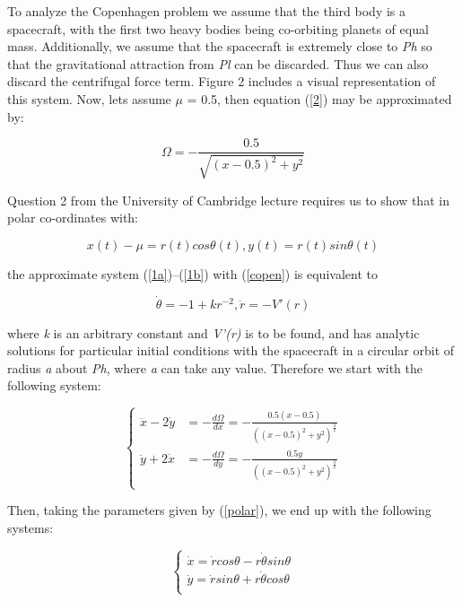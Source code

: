 \documentclass{article}
\begin{document}
To analyze the Copenhagen problem we assume that the third body is a spacecraft, with the first two heavy bodies being co-orbiting planets of equal mass. Additionally, we assume that the spacecraft is extremely close to \textit{Ph} so that the gravitational attraction from \textit{Pl} can be discarded. Thus we can also discard the centrifugal force term. Figure 2 includes a visual representation of this system. Now, lets assume $\mu$ = 0.5, then equation (\ref{2}) may be approximated by:

\begin{equation}\label{copen}
\Omega = - \frac{0.5}{ \sqrt{ (x - 0.5)^2+ y^2}}
\end{equation}

Question 2 from the University of Cambridge lecture requires us to show that in polar co-ordinates with:

\begin{equation}\label{polar}
x(t) - \mu = r(t) cos \theta(t), y(t) = r(t) sin \theta(t)
\end{equation}

\newpage

the approximate system (\ref{1a})–(\ref{1b}) with (\ref{copen}) is equivalent to

\begin{equation}\label{polara}
\dot{\theta} = -1 + kr^{-2}, \ddot{r} = -V'(r)
\end{equation}

where \textit{k} is an arbitrary constant and \textit{V'(r)} is to be found, and has analytic solutions  for particular initial conditions with the spacecraft in a circular orbit of radius \textit{a} about \textit{Ph}, where \textit{a} can take any value. Therefore we start with the following system:

\begin{equation}\label{copenstart}
   \begin{cases}
      \ddot{x} - 2 \dot{y} & = - \frac{d \Omega}{dx} = - \frac{0.5 (x-0.5)}{ ((x - 0.5)^2+ y^2)^{\frac{3}{2}}}\\
      \ddot{y} + 2 \dot{x} & = - \frac{d \Omega}{dy} = - \frac{0.5 y}{ ((x - 0.5)^2+ y^2)^{\frac{3}{2}}}\\                
   \end{cases}   
\end{equation}

Then, taking the parameters given by (\ref{polar}), we end up with the following systems:

\begin{equation}\label{copensecond}
   \begin{cases}
      \dot{x} = \dot{r} cos\theta - r\dot{\theta} sin\theta \\
      \dot{y} = \dot{r} sin\theta + r\dot{\theta} cos\theta \\
   \end{cases}   
\end{equation}
\end{document}
